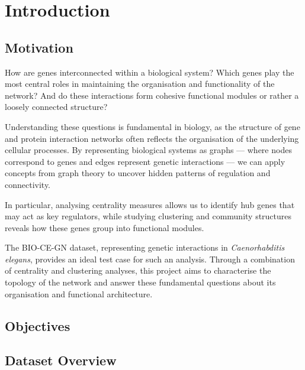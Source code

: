 \section{Introduction}

\subsection{Motivation}
How are genes interconnected within a biological system? 
Which genes play the most central roles in maintaining the organisation and functionality of the network? 
And do these interactions form cohesive functional modules or rather a loosely connected structure?

Understanding these questions is fundamental in biology, as the structure of gene and protein interaction networks often reflects the organisation of the underlying cellular processes.
By representing biological systems as graphs — where nodes correspond to genes and edges represent genetic interactions — we can apply concepts from graph theory to uncover hidden patterns of regulation and connectivity.

In particular, analysing centrality measures allows us to identify hub genes that may act as key regulators, while studying clustering and community structures reveals how these genes group into functional modules. 

The BIO-CE-GN dataset, representing genetic interactions in \textit{Caenorhabditis elegans}, provides an ideal test case for such an analysis. 
Through a combination of centrality and clustering analyses, this project aims to characterise the topology of the network and answer these fundamental questions about its organisation and functional architecture.

\subsection{Objectives}

\subsection{Dataset Overview}
